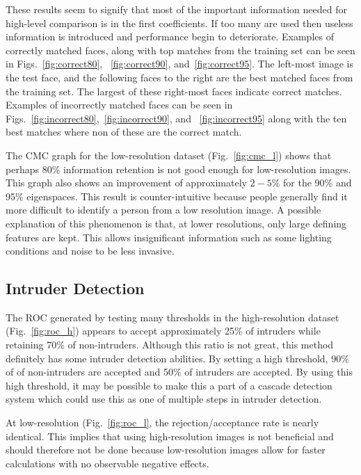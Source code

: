   These results seem to signify that most of the important information needed for high-level
  comparison is in the first coefficients.  If too many are used then useless information is
  introduced and performance begin to deteriorate.  Examples of correctly matched faces,
  along with top matches from the training set can be seen in Figs.~\ref{fig:correct80},
  ~\ref{fig:correct90}, and~\ref{fig:correct95}.  The left-most image is the test face, and
  the following faces to the right are the best matched faces from the training set.  The
  largest of these right-most faces indicate correct matches.  Examples of incorrectly
  matched faces can be seen in Figs.~\ref{fig:incorrect80},~\ref{fig:incorrect90}, and
  ~\ref{fig:incorrect95} along with the ten best matches where non of these are the
  correct match.

  The CMC graph for the low-resolution dataset (Fig.~\ref{fig:cmc_l}) shows that perhaps
  80\% information retention is not good enough for low-resolution images.  This graph
  also shows an improvement of approximately $2-5\%$ for the 90\% and 95\% eigenspaces.
  This result is counter-intuitive because people generally find it more difficult to
  identify a person from a low resolution image.  A possible explanation of this
  phenomenon is that, at lower resolutions, only large defining features are kept.  This
  allows insignificant information such as some lighting conditions and noise to be
  less invasive.

  \subsection{Intruder Detection}

  The ROC generated by testing many thresholds in the high-resolution dataset
  (Fig.~\ref{fig:roc_h}) appears to accept approximately 25\% of intruders while retaining
  70\% of non-intruders. Although this ratio is not great, this method definitely has
  some intruder detection abilities.  By setting a high threshold, 90\% of of non-intruders
  are accepted and 50\% of intruders are accepted.  By using this high threshold, it may
  be possible to make this a part of a cascade detection system which could use this as
  one of multiple steps in intruder detection.
  
  At low-resolution (Fig.~\ref{fig:roc_l}, the rejection/acceptance rate is nearly identical.
  This implies that using high-resolution images is not beneficial and should therefore
  not be done because low-resolution images allow for faster calculations with no observable
  negative effects.


